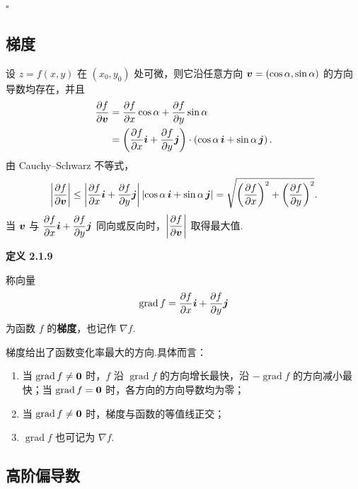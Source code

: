 $\square$



\subsection*{梯度}

设 $z=f(x,y)$ 在 $(x_0,y_0)$ 处可微，则它沿任意方向
$\boldsymbol{v}=(\cos\alpha,\sin\alpha)$ 的方向导数均存在，并且
\[
\begin{aligned}
\frac{\partial f}{\partial\boldsymbol{v}}
&=
\frac{\partial f}{\partial x}\cos\alpha
+
\frac{\partial f}{\partial y}\sin\alpha\\
&=
\left(
\frac{\partial f}{\partial x}\boldsymbol{i}
+
\frac{\partial f}{\partial y}\boldsymbol{j}
\right)
\cdot
\left(\cos\alpha\,\boldsymbol{i}+\sin\alpha\,\boldsymbol{j}\right).
\end{aligned}
\]
由 Cauchy--Schwarz 不等式，
\[
\left|
\frac{\partial f}{\partial\boldsymbol{v}}
\right|
\leq
\left|
\frac{\partial f}{\partial x}\boldsymbol{i}
+
\frac{\partial f}{\partial y}\boldsymbol{j}
\right|
\left|\cos\alpha\,\boldsymbol{i}+\sin\alpha\,\boldsymbol{j}\right|
=
\sqrt{
\left(\frac{\partial f}{\partial x}\right)^2
+
\left(\frac{\partial f}{\partial y}\right)^2
}.
\]
当 $\boldsymbol{v}$ 与
$\dfrac{\partial f}{\partial x}\boldsymbol{i}+
\dfrac{\partial f}{\partial y}\boldsymbol{j}$
同向或反向时，$\left|\dfrac{\partial f}{\partial\boldsymbol{v}}\right|$ 取得最大值.



\textbf{定义 2.1.9}

称向量
	\[
	\operatorname{grad}f
	=
	\frac{\partial f}{\partial x}\boldsymbol{i}
	+
	\frac{\partial f}{\partial y}\boldsymbol{j}
	\]
	为函数 $f$ 的\textbf{梯度}，也记作 $\nabla f$.




梯度给出了函数变化率最大的方向.具体而言：
\begin{enumerate}
	\item 当 $\operatorname{grad}f\ne\boldsymbol{0}$ 时，$f$ 沿
	$\operatorname{grad}f$ 的方向增长最快，沿
	$-\operatorname{grad}f$ 的方向减小最快；当
	$\operatorname{grad}f=\boldsymbol{0}$ 时，各方向的方向导数均为零；
	\item 当 $\operatorname{grad}f\ne\boldsymbol{0}$ 时，梯度与函数的等值线正交；
	\item $\operatorname{grad}f$ 也可记为 $\nabla f$.
\end{enumerate}

\subsection*{高阶偏导数}

